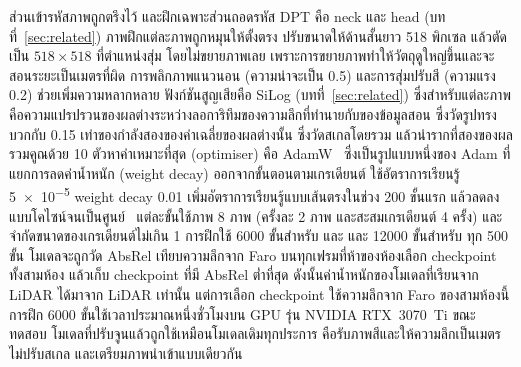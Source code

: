 ส่วนเข้ารหัสภาพถูกตรึงไว้ และฝึกเฉพาะส่วนถอดรหัส DPT คือ neck และ head (บทที่~\ref{sec:related})
ภาพฝึกแต่ละภาพถูกหมุนให้ตั้งตรง ปรับขนาดให้ด้านสั้นยาว 518 พิกเซล แล้วตัดเป็น $518\times518$ ที่ตำแหน่งสุ่ม
โดยไม่ขยายภาพเลย เพราะการขยายภาพทำให้วัตถุดูใหญ่ขึ้นและจะสอนระยะเป็นเมตรที่ผิด การพลิกภาพแนวนอน
(ความน่าจะเป็น 0.5) และการสุ่มปรับสี (ความแรง 0.2) ช่วยเพิ่มความหลากหลาย ฟังก์ชันสูญเสียคือ SiLog
(บทที่~\ref{sec:related}) ซึ่งสำหรับแต่ละภาพ คือความแปรปรวนของผลต่างระหว่างลอการิทึมของความลึกที่ทำนายกับของข้อมูลสอน
ซึ่งวัดรูปทรง บวกกับ 0.15 เท่าของกำลังสองของค่าเฉลี่ยของผลต่างนั้น ซึ่งวัดสเกลโดยรวม
แล้วนำรากที่สองของผลรวมคูณด้วย 10 ตัวหาค่าเหมาะที่สุด (optimiser) คือ AdamW~\cite{adamw}
ซึ่งเป็นรูปแบบหนึ่งของ Adam ที่แยกการลดค่าน้ำหนัก (weight decay) ออกจากขั้นตอนตามเกรเดียนต์
ใช้อัตราการเรียนรู้ \num{5e-5} weight decay 0.01 เพิ่มอัตราการเรียนรู้แบบเส้นตรงในช่วง 200 ขั้นแรก
แล้วลดลงแบบโคไซน์จนเป็นศูนย์~\cite{sgdr} แต่ละขั้นใช้ภาพ 8 ภาพ (ครั้งละ 2 ภาพ และสะสมเกรเดียนต์ 4 ครั้ง)
และจำกัดขนาดของเกรเดียนต์ไม่เกิน 1 การฝึกใช้ \num{6000} ขั้นสำหรับ \ftfaro{} และ \ftlidar{}
และ \num{12000} ขั้นสำหรับ \ftmain{} ทุก 500 ขั้น โมเดลจะถูกวัด AbsRel เทียบความลึกจาก Faro
บนทุกเฟรมที่ห้าของห้องเลือก checkpoint ทั้งสามห้อง แล้วเก็บ checkpoint ที่มี AbsRel ต่ำที่สุด
ดังนั้นค่าน้ำหนักของโมเดลที่เรียนจาก LiDAR ได้มาจาก LiDAR เท่านั้น แต่การเลือก checkpoint ใช้ความลึกจาก Faro
ของสามห้องนี้ การฝึก \num{6000} ขั้นใช้เวลาประมาณหนึ่งชั่วโมงบน GPU รุ่น NVIDIA RTX~3070~Ti
ขณะทดสอบ โมเดลที่ปรับจูนแล้วถูกใช้เหมือนโมเดลเดิมทุกประการ คือรับภาพสีและให้ความลึกเป็นเมตร
ไม่ปรับสเกล และเตรียมภาพนำเข้าแบบเดียวกัน

